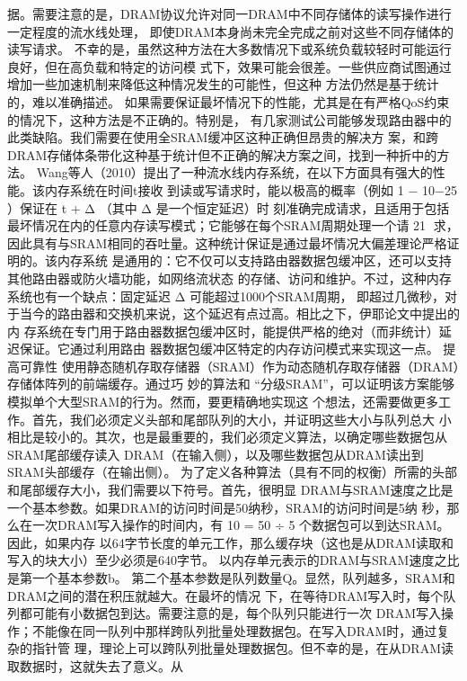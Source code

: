 据。需要注意的是，DRAM协议允许对同一DRAM中不同存储体的读写操作进行一定程度的流水线处理，
即使DRAM本身尚未完全完成之前对这些不同存储体的读写请求。
不幸的是，虽然这种方法在大多数情况下或系统负载较轻时可能运行良好，但在高负载和特定的访问模
式下，效果可能会很差。一些供应商试图通过增加一些加速机制来降低这种情况发生的可能性，但这种
方法仍然是基于统计的，难以准确描述。
如果需要保证最坏情况下的性能，尤其是在有严格QoS约束的情况下，这种方法是不正确的。特别是，
有几家测试公司能够发现路由器中的此类缺陷。我们需要在使用全SRAM缓冲区这种正确但昂贵的解决方
案，和跨DRAM存储体条带化这种基于统计但不正确的解决方案之间，找到一种折中的方法。
Wang等人（2010）提出了一种流水线内存系统，在以下方面具有强大的性能。该内存系统在时间t接收
到读或写请求时，能以极高的概率（例如 1 − 10−25 ）保证在 t + Δ （其中 Δ 是一个恒定延迟）时
刻准确完成请求，且适用于包括最坏情况在内的任意内存读写模式；它能够在每个SRAM周期处理一个请
                                                     21
求，因此具有与SRAM相同的吞吐量。这种统计保证是通过最坏情况大偏差理论严格证明的。该内存系统
是通用的：它不仅可以支持路由器数据包缓冲区，还可以支持其他路由器或防火墙功能，如网络流状态
的存储、访问和维护。不过，这种内存系统也有一个缺点：固定延迟 Δ 可能超过1000个SRAM周期，
即超过几微秒，对于当今的路由器和交换机来说，这个延迟有点过高。相比之下，伊耶论文中提出的内
存系统在专门用于路由器数据包缓冲区时，能提供严格的绝对（而非统计）延迟保证。它通过利用路由
器数据包缓冲区特定的内存访问模式来实现这一点。
提高可靠性
使用静态随机存取存储器（SRAM）作为动态随机存取存储器（DRAM）存储体阵列的前端缓存。通过巧
妙的算法和 “分级SRAM”，可以证明该方案能够模拟单个大型SRAM的行为。然而，要更精确地实现这
个想法，还需要做更多工作。首先，我们必须定义头部和尾部队列的大小，并证明这些大小与队列总大
小相比是较小的。其次，也是最重要的，我们必须定义算法，以确定哪些数据包从SRAM尾部缓存读入
DRAM（在输入侧），以及哪些数据包从DRAM读出到SRAM头部缓存（在输出侧）。
为了定义各种算法（具有不同的权衡）所需的头部和尾部缓存大小，我们需要以下符号。首先，很明显
DRAM与SRAM速度之比是一个基本参数。如果DRAM的访问时间是50纳秒，SRAM的访问时间是5纳
秒，那么在一次DRAM写入操作的时间内，有 10 = 50 ÷ 5 个数据包可以到达SRAM。因此，如果内存
以64字节长度的单元工作，那么缓存块（这也是从DRAM读取和写入的块大小）至少必须是640字节。
以内存单元表示的DRAM与SRAM速度之比是第一个基本参数b。
第二个基本参数是队列数量Q。显然，队列越多，SRAM和DRAM之间的潜在积压就越大。在最坏的情况
下，在等待DRAM写入时，每个队列都可能有小数据包到达。需要注意的是，每个队列只能进行一次
DRAM写入操作；不能像在同一队列中那样跨队列批量处理数据包。在写入DRAM时，通过复杂的指针管
理，理论上可以跨队列批量处理数据包。但不幸的是，在从DRAM读取数据时，这就失去了意义。从
